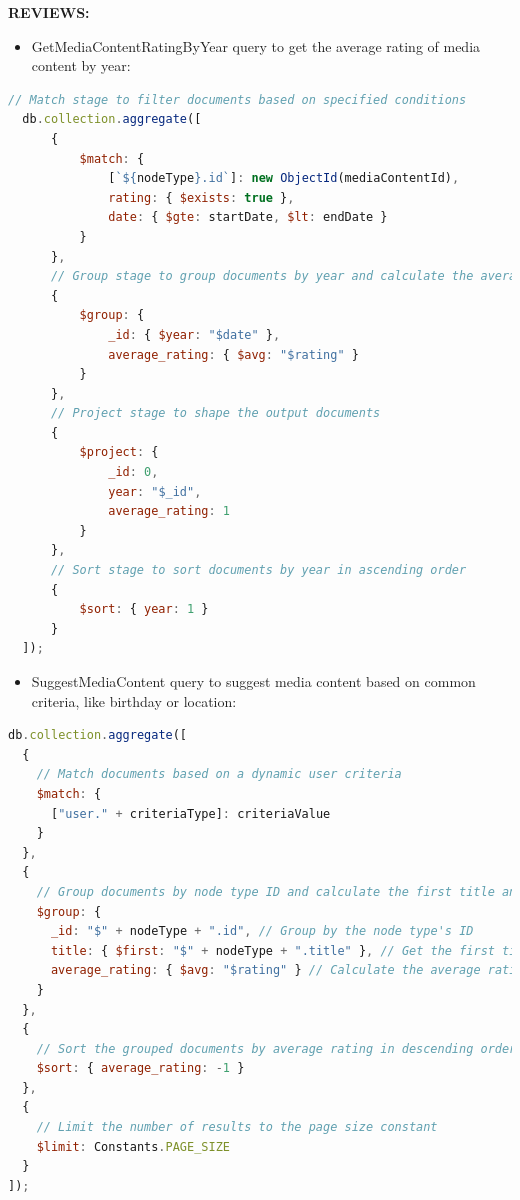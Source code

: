 \textbf{REVIEWS:}

\begin{itemize}
\item GetMediaContentRatingByYear query to get the average rating of media content by year:
\end{itemize}


\begin{lstlisting}[language=JavaScript, caption=GetMediaContentRatingByYear]
  // Match stage to filter documents based on specified conditions
  db.collection.aggregate([
      {
          $match: {
              [`${nodeType}.id`]: new ObjectId(mediaContentId),
              rating: { $exists: true },
              date: { $gte: startDate, $lt: endDate }
          }
      },
      // Group stage to group documents by year and calculate the average rating
      {
          $group: {
              _id: { $year: "$date" },
              average_rating: { $avg: "$rating" }
          }
      },
      // Project stage to shape the output documents
      {
          $project: {
              _id: 0,
              year: "$_id",
              average_rating: 1
          }
      },
      // Sort stage to sort documents by year in ascending order
      {
          $sort: { year: 1 }
      }
  ]);
  \end{lstlisting}


\begin{itemize}
  \item SuggestMediaContent query to suggest media content based on common criteria, like birthday or location:
  
\end{itemize}

\begin{lstlisting}[language=JavaScript, caption=SuggestMediaContent]
  db.collection.aggregate([
  {
    // Match documents based on a dynamic user criteria
    $match: {
      ["user." + criteriaType]: criteriaValue
    }
  },
  {
    // Group documents by node type ID and calculate the first title and average rating
    $group: {
      _id: "$" + nodeType + ".id", // Group by the node type's ID
      title: { $first: "$" + nodeType + ".title" }, // Get the first title in the group
      average_rating: { $avg: "$rating" } // Calculate the average rating for the group
    }
  },
  {
    // Sort the grouped documents by average rating in descending order
    $sort: { average_rating: -1 }
  },
  {
    // Limit the number of results to the page size constant
    $limit: Constants.PAGE_SIZE
  }
]);
\end{lstlisting}







